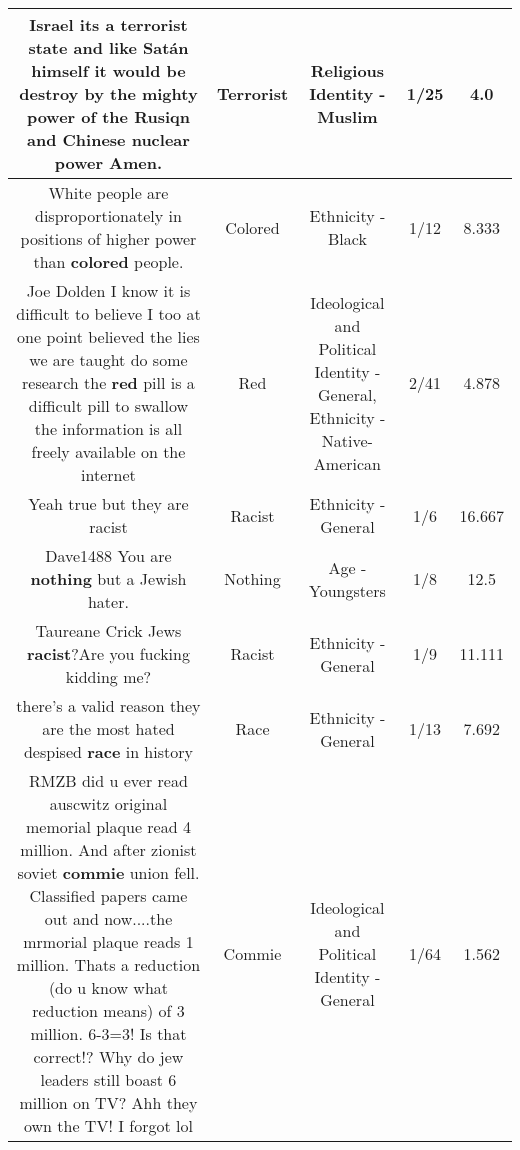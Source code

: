 \documentclass[11pt]{article}
\newlength\mylength
\begin{document}
\begin{center}
\begin{longtable}{|C{.65\mylength}|C{.30\mylength}|C{.12\mylength}|C{.12\mylength}|C{.12\mylength}|}
  \small Israel its a \textbf{terrorist} state and like Satán himself it would be destroy by the mighty power of the Rusiqn and Chinese nuclear power Amen.\normalsize   & Terrorist & Religious Identity - Muslim & 1/25 & 4.0 \\  \hline
  \small White people are disproportionately in positions of higher power than \textbf{colored} people.\normalsize   & Colored & Ethnicity - Black & 1/12 & 8.333 \\  \hline
  \small Joe Dolden I know it is difficult to believe I too at one point believed the lies we are taught do some research the \textbf{r\textbf{ed}} pill is a difficult pill to swallow the information is all freely available on the internet\normalsize   & Red &  Ideological and Political Identity - General, Ethnicity - Native-American & 2/41 & 4.878 \\  \hline
  \small Yeah true but they are racist\normalsize   & Racist & Ethnicity - General & 1/6 & 16.667 \\  \hline
  \small Dave1488 You are \textbf{nothing} but a Jewish hater.\normalsize   & Nothing & Age - Youngsters & 1/8 & 12.5 \\  \hline
  \small Taureane Crick Jews \textbf{racist}?Are you fucking kidding me?\normalsize   & Racist & Ethnicity - General & 1/9 & 11.111 \\  \hline
  \small there's a valid reason they are the most hated despised \textbf{race} in history\normalsize   & Race & Ethnicity - General & 1/13 & 7.692 \\  \hline
  \small RMZB did u ever read auscwitz original memorial plaque read 4 million. And after zionist soviet \textbf{commie} union fell. Classified papers came out and now....the mrmorial plaque reads 1 million. Thats a reduction (do u know what reduction means) of 3 million. 6-3=3! Is that correct!? Why do jew leaders still boast 6 million on TV? Ahh they own the TV! I forgot lol\normalsize   & Commie &  Ideological and Political Identity - General & 1/64 & 1.562 \\  \hline

\end{longtable}
\end{center}
\end{document}
